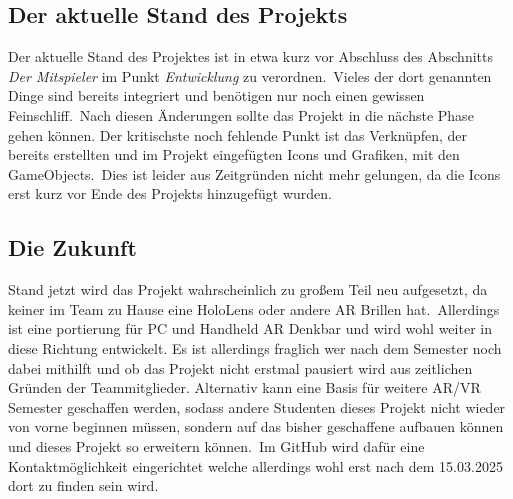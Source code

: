 \subsection{Der aktuelle Stand des Projekts}\label{subsec:current_state}
Der aktuelle Stand des Projektes ist in etwa kurz vor Abschluss des Abschnitts \textit{Der Mitspieler} im Punkt
\textit{Entwicklung} zu verordnen.\ Vieles der dort genannten Dinge sind bereits integriert und benötigen nur noch einen
gewissen Feinschliff.\ Nach diesen Änderungen sollte das Projekt in die nächste Phase gehen können.
Der kritischste noch fehlende Punkt ist das Verknüpfen, der bereits erstellten und im Projekt eingefügten Icons und
Grafiken, mit den GameObjects.\ Dies ist leider aus Zeitgründen nicht mehr gelungen, da die Icons erst kurz vor Ende des
Projekts hinzugefügt wurden.

\subsection{Die Zukunft}\label{subsec:back_to_the_future}
Stand jetzt wird das Projekt wahrscheinlich zu großem Teil neu aufgesetzt, da keiner im Team zu Hause eine HoloLens
oder andere AR Brillen hat.\ Allerdings ist eine portierung für PC und Handheld AR Denkbar und wird wohl weiter
in diese Richtung entwickelt.
Es ist allerdings fraglich wer nach dem Semester noch dabei mithilft und ob das Projekt nicht erstmal pausiert wird aus
zeitlichen Gründen der Teammitglieder.
Alternativ kann eine Basis für weitere AR/VR Semester geschaffen werden, sodass andere Studenten dieses Projekt nicht
wieder von vorne beginnen müssen, sondern auf das bisher geschaffene aufbauen können und dieses Projekt so erweitern
können.\ Im GitHub wird dafür eine Kontaktmöglichkeit eingerichtet welche allerdings wohl erst nach dem 15.03.2025
dort zu finden sein wird.